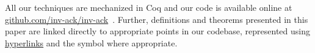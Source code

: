 All our techniques are mechanized in Coq and our code is available
online at \href{https://github.com/inv-ack/inv-ack}{\color{blue}github.com/inv-ack/inv-ack}~\cite{inv-ack}. Further, definitions and theorems presented
in this paper are linked directly to appropriate points in our codebase,
represented using \href{https://github.com/inv-ack/inv-ack}{\color{blue}hyperlinks}
and the symbol \href{https://github.com/inv-ack/inv-ack}{\color{blue}\coq} where appropriate.


